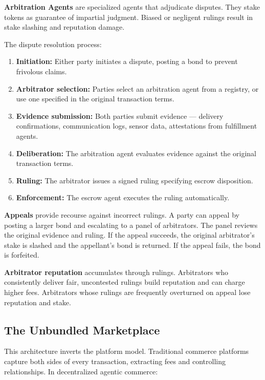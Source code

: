 \documentclass{article}
\begin{document}
\textbf{Arbitration Agents} are specialized agents that adjudicate disputes. They stake tokens as guarantee of impartial judgment. Biased or negligent rulings result in stake slashing and reputation damage.

The dispute resolution process:

\begin{enumerate}
    \item \textbf{Initiation:}
    Either party initiates a dispute, posting a bond to prevent frivolous claims.

    \item \textbf{Arbitrator selection:}
    Parties select an arbitration agent from a registry, or use one specified in the original transaction terms.

    \item \textbf{Evidence submission:}
    Both parties submit evidence  --- delivery confirmations, communication logs, sensor data, attestations from fulfillment agents.

    \item \textbf{Deliberation:}
    The arbitration agent evaluates evidence against the original transaction terms.

    \item \textbf{Ruling:}
    The arbitrator issues a signed ruling specifying escrow disposition.

    \item \textbf{Enforcement:}
    The escrow agent executes the ruling automatically.
\end{enumerate}

\textbf{Appeals} provide recourse against incorrect rulings. A party can appeal by posting a larger bond and escalating to a panel of arbitrators. The panel reviews the original evidence and ruling. If the appeal succeeds, the original arbitrator's stake is slashed and the appellant's bond is returned. If the appeal fails, the bond is forfeited.

\textbf{Arbitrator reputation} accumulates through rulings. Arbitrators who consistently deliver fair, uncontested rulings build reputation and can charge higher fees. Arbitrators whose rulings are frequently overturned on appeal lose reputation and stake.

\subsection{The Unbundled Marketplace}

This architecture inverts the platform model. Traditional commerce platforms capture both sides of every transaction, extracting fees and controlling relationships. In decentralized agentic commerce:
\end{document}
